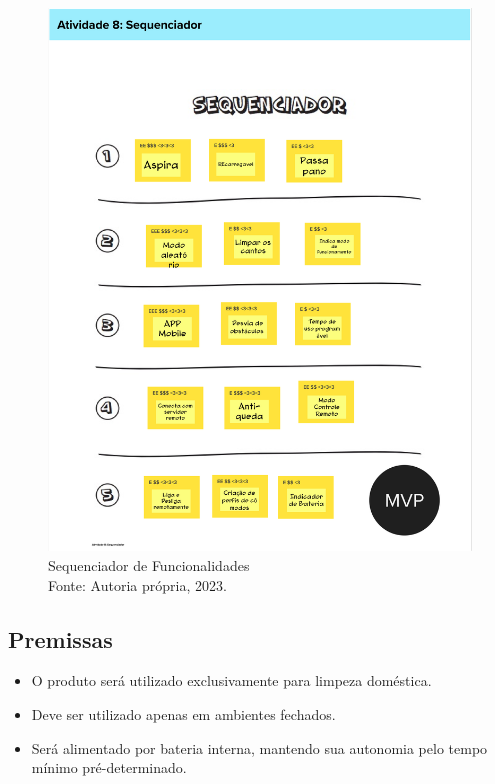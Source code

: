 \begin{figure}[H]
\centering
\includegraphics[height=0.7\textheight]{figuras/Lean Inception/Mural - Sequenciador.png}
\caption{Sequenciador de Funcionalidades \\ Fonte: Autoria própria, 2023.}
\label{sequenciador}
\end{figure}


\subsection{Premissas}
\begin{itemize}
\item O produto será utilizado exclusivamente para limpeza doméstica.
\item Deve ser utilizado apenas em ambientes fechados.
\item Será alimentado por bateria interna, mantendo sua autonomia pelo tempo mínimo pré-determinado. 
\end{itemize}

